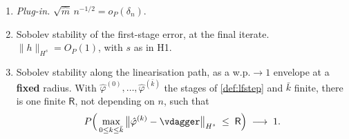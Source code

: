 \begin{assumption}
\begin{enumerate}
\item[(v)] \emph{Plug-in.} $\sqrt{\hat m}\,n^{-1/2}=o_P(\delta_n)$.
\item[(vi)] Sobolev stability of the first-stage error, at the final iterate.
$\|h\|_{H^{s}}=O_P(1)$, with $s$ as in H1.
\item[(vi$'$)] Sobolev stability along the linearisation path, as a w.p.$\to1$ envelope at a
\textbf{fixed} radius. With $\hat\varphi^{(0)},\dots,\hat\varphi^{(\bar k)}$ the stages of
\cref{def:lfstep} and $\bar k$ finite, there is one finite $\mathsf R$, not depending on $n$, such that
\[
P\Big(\max_{0\le k\le\bar k}\big\|\hat\varphi^{(k)}-\vdagger\big\|_{H^{s}}\;\le\;\mathsf R\Big)
\;\longrightarrow\;1 .
\]
\end{enumerate}
\end{assumption}


